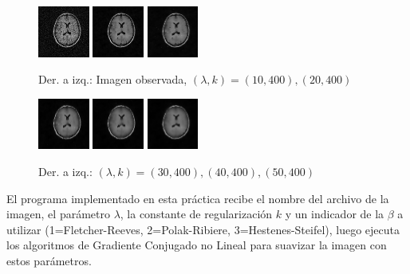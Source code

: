 \documentclass[10pt,journal,compsoc]{styles/IEEEtran}
\begin{document}
\begin{figure}[H]
	\centering
	\includegraphics[width=0.15\textwidth]{mri.png}
	\includegraphics[width=0.15\textwidth]{PR10K4002.png}
	\includegraphics[width=0.15\textwidth]{PR20K4002.png}
	
	\caption{Der. a izq.: Imagen observada, $(\lambda,k)=(10,400),(20,400)$}
\end{figure}

\begin{figure}[H]
	\centering
	\includegraphics[width=0.15\textwidth]{PR30K4002.png}
	\includegraphics[width=0.15\textwidth]{PR40K4002.png}
	\includegraphics[width=0.15\textwidth]{PR50K4002.png}
	
	\caption{Der. a izq.: $(\lambda,k)=(30,400),(40,400),(50,400)$ }
\end{figure}

El programa implementado en esta práctica recibe el nombre del archivo de la imagen, el parámetro $\lambda$, la constante de regularizaci\'on $k$ y un indicador de la $\beta$ a utilizar (1=Fletcher-Reeves, 2=Polak-Ribiere, 3=Hestenes-Steifel), luego ejecuta los algoritmos de Gradiente Conjugado no Lineal para suavizar la imagen con estos parámetros.\\
\end{document}
